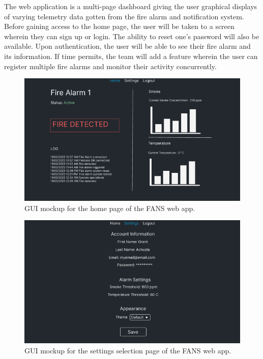 The web application is a multi-page dashboard giving the user graphical displays of varying telemetry data gotten from
the fire alarm and notification system. Before gaining access to the home page, the user will be taken to a screen
wherein they can sign up or login. The ability to reset one's password will also be available. Upon authentication, the
user will be able to see their fire alarm and its information. If time permits, the team will add a feature wherein the
user can register multiple fire alarms and monitor their activity concurrently.

\begin{figure}[H]
    \centering
    \includegraphics[width=\linewidth]{../assets/HomePage.png}
    \caption{GUI mockup for the home page of the FANS web app.}
\end{figure}

\begin{figure}[H]
    \centering
    \includegraphics[width=\linewidth]{../assets/SettingsPage.png}
    \caption{GUI mockup for the settings selection page of the FANS web app.}
\end{figure}

